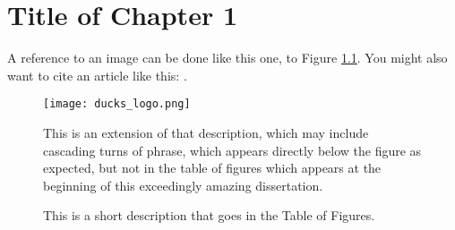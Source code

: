 \chapter{Title of Chapter 1}

A reference to an image can be done like this one, to Figure \ref{ducks}. You might also want to cite an article like this: \cite{interesting_article}.

\begin{figure}[ht!]
\centering
\texttt{[image: ducks\_logo.png]}
\caption{\label{ducks}This is a short description that goes in the Table of Figures.}{This is an extension of that description, which may include cascading turns of phrase, which appears directly below the figure as expected, but not in the table of figures which appears at the beginning of this exceedingly amazing dissertation.}
\end{figure}